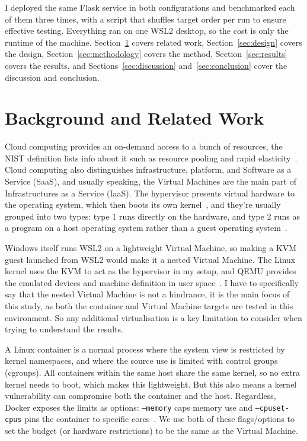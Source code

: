 \documentclass[conference,a4paper]{IEEEtran}
\begin{document}
I deployed the same Flask service in both configurations and benchmarked each of them three times, with a script that shuffles target order per run to ensure effective testing. Everything ran on one WSL2 desktop, so the cost is only the runtime of the machine. Section~\ref{sec:related_work} covers related work, Section~\ref{sec:design} covers the design, Section~\ref{sec:methodology} covers the method, Section~\ref{sec:results} covers the results, and Sections~\ref{sec:discussion} and~\ref{sec:conclusion} cover the discussion and conclusion.

\section{Background and Related Work}
\label{sec:related_work}
Cloud computing provides an on-demand access to a bunch of resources, the NIST definition lists info about it such as resource pooling and rapid elasticity~\cite{b1}. Cloud computing also distinguishes infrastructure, platform, and Software as a Service (SaaS), and usually speaking, the Virtual Machines are the main part of Infrastructures as a Service (IaaS). The hypervisor presents virtual hardware to the operating system, which then boots its own kernel~\cite{b2}, and they’re usually grouped into two types: type 1 runs directly on the hardware, and type 2 runs as a program on a host operating system rather than a guest operating system~\cite{b2}.

Windows itself runs WSL2 on a lightweight Virtual Machine, so making a KVM guest launched from WSL2 would make it a nested Virtual Machine. The Linux kernel uses the KVM to act as the hypervisor in my setup, and QEMU provides the emulated devices and machine definition in user space~\cite{b5}. I have to specifically say that the nested Virtual Machine is not a hindrance, it is the main focus of this study, as both the container and Virtual Machine targets are tested in this environment. So any additional virtualisation is a key limitation to consider when trying to understand the results.

A Linux container is a normal process where the system view is restricted by kernel namespaces, and where the source use is limited with control groups (cgroups). All containers within the same host share the same kernel, so no extra kernel needs to boot, which makes this lightweight. But this also means a kernel vulnerability can compromise both the container and the host. Regardless, Docker exposes the limits as options: \texttt{--memory} caps memory use and \texttt{--cpuset-cpus} pins the container to specific cores~\cite{b4}.  We use both of these flags/options to set the budget (or hardware restrictions) to be the same as the Virtual Machine.
\end{document}
